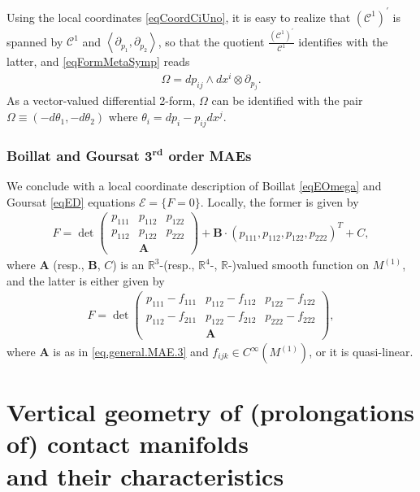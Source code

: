 \documentclass[pdftex]{sigma}
\newcommand{\R}{\mathbb{R}}
\newcommand{\C}{\mathcal{C}}
\newcommand{\A}{\boldsymbol{A}}
\newcommand{\E}{\mathcal{E}}
\newcommand{\B}{\boldsymbol{B}}
\newcommand{\Span}[1]{\left\langle #1 \right\rangle}
\newcommand{\Rd}{^\textrm{rd}}
\newcommand{\p}{\varrho}
\numberwithin{equation}{section}
\begin{document}
Using the local coordinates
\eqref{eqCoordCiUno}, it is easy to realize that $(\C^{1})^\prime$ is spanned by $\C^1$ and $\Span{\partial_{p_1},\partial_{p_2}}$, so that the quotient $\frac{(\C^{1})^\prime}{\C^1}$ identif\/ies with the latter, and \eqref{eqFormMetaSymp} reads
 \begin{gather}\label{eqFormMetaSympLOC}
\Omega=dp_{ij} \wedge dx^i \otimes\partial_{p_j}.
\end{gather}
As a vector-valued dif\/ferential 2-form, $\Omega$ can be identif\/ied with the pair $\Omega \equiv (-d\theta_1,-d\theta_2)$
where $\theta_i=dp_i-p_{ij}dx^j$.

\subsubsection[Boillat and Goursat $3\Rd$ order MAEs]{Boillat and Goursat $\boldsymbol{3\Rd}$ order MAEs}

We conclude with a local coordinate description of Boillat \eqref{eqEOmega} and Goursat \eqref{eqED} equations $\E=\{F=0\}$.
Locally, the former is given by
\begin{gather}\label{eq.general.MAE.3}
F=\det\left(\begin{matrix}p_{111} & p_{112} & p_{122} \\p_{112} & p_{122} & p_{222} \\ & \A & \end{matrix}\right)+\B\cdot (p_{111},p_{112},p_{122},p_{222})^T+C,
\end{gather}
where $ \A$ (resp., $\B$, $C$) is an $\R^3$-(resp., $\R^4$-, $\R$-)valued smooth function on $M^{(1)}$,
and the latter is either given by
 \begin{gather}\label{eqGoursat}
 F=\det\left(\begin{matrix}p_{111}-f_{111} & p_{112}-f_{112} & p_{122}-f_{122} \\p_{112}-f_{211} & p_{122}-f_{212} & p_{222}-f_{222} \\ & \A & \end{matrix}\right),
\end{gather}
where $\A$ is as in \eqref{eq.general.MAE.3} and $f_{ijk}\in C^\infty(M^{(1)})$, or it is quasi-linear.

\section[Vertical geometry of (prolongations of) contact manifolds and their characteristics]{Vertical geometry of (prolongations of) contact manifolds\\ and their characteristics}\label{secCono}
\end{document}
